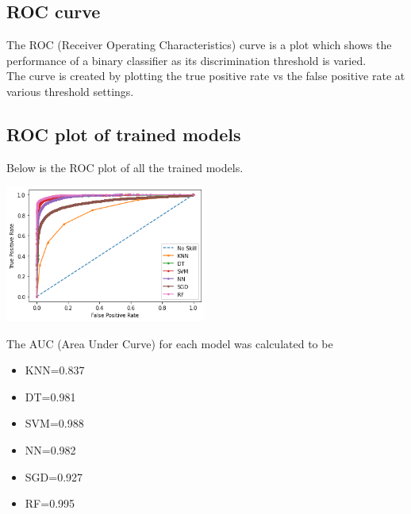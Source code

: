 \subsection{ROC curve}
The ROC (Receiver Operating Characteristics) curve is a plot which shows the performance of a binary classifier as its discrimination threshold is varied.\\
The curve is created by plotting the true positive rate vs the false positive rate at various threshold settings.

\subsection{ROC plot of trained models}
Below is the ROC plot of all the trained models.
\begin{center}
    \captionsetup{type=figure}
    \includegraphics[width=250px]{AUC.png}
\end{center}

The AUC (Area Under Curve) for each model was calculated to be 
\begin{itemize}
    \item KNN=0.837
    \item DT=0.981
    \item SVM=0.988
    \item NN=0.982
    \item SGD=0.927
    \item RF=0.995
\end{itemize}





